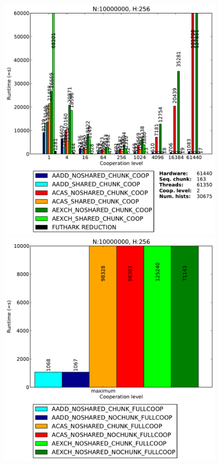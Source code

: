 \begin{figure}
\begin{minipage}{0.5\textwidth}
\end{minipage}
\begin{minipage}{0.5\textwidth}
\includegraphics[scale=0.35]{input/content/figures/experiment/hist-256}
\end{minipage}
\begin{minipage}{0.5\textwidth}
\includegraphics[scale=0.35]{input/content/figures/experiment/hist-256-full}

\end{minipage}
\end{figure}

